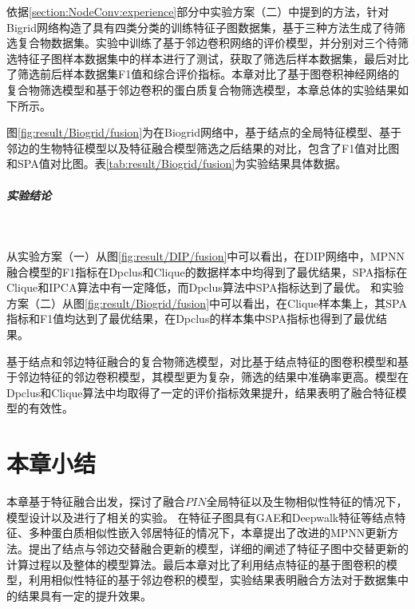 依据\ref{section:NodeConv:experience}部分中实验方案（二）中提到的方法，针对Bigrid网络构造了具有四类分类的训练特征子图数据集，基于三种方法生成了待筛选复合物数据集。实验中训练了基于邻边卷积网络的评价模型，并分别对三个待筛选特征子图样本数据集中的样本进行了测试，获取了筛选后样本数据集，最后对比了筛选前后样本数据集F1值和综合评价指标。本章对比了基于图卷积神经网络的复合物筛选模型和基于邻边卷积的蛋白质复合物筛选模型，本章总体的实验结果如下所示。

图\ref{fig:result/Biogrid/fusion}为在Biogrid网络中，基于结点的全局特征模型、基于邻边的生物特征模型以及特征融合模型筛选之后结果的对比，包含了F1值对比图和SPA值对比图。表\ref{tab:result/Biogrid/fusion}为实验结果具体数据。

\subparagraph*{实验结论} ~

从实验方案（一）从图\ref{fig:result/DIP/fusion}中可以看出，在DIP网络中，MPNN融合模型的F1指标在Dpclus和Clique的数据样本中均得到了最优结果，SPA指标在Clique和IPCA算法中有一定降低，而Dpclus算法中SPA指标达到了最优。
和实验方案（二）从图\ref{fig:result/Biogrid/fusion}中可以看出，在Clique样本集上，其SPA指标和F1值均达到了最优结果，在Dpclus的样本集中SPA指标也得到了最优结果。

基于结点和邻边特征融合的复合物筛选模型，对比基于结点特征的图卷积模型和基于邻边特征的邻边卷积模型，其模型更为复杂，筛选的结果中准确率更高。模型在Dpclus和Clique算法中均取得了一定的评价指标效果提升，结果表明了融合特征模型的有效性。


\section{本章小结}
\label{section:MPNN:summary}

本章基于特征融合出发，探讨了融合$PIN$全局特征以及生物相似性特征的情况下，模型设计以及进行了相关的实验。
在特征子图具有GAE和Deepwalk特征等结点特征、多种蛋白质相似性嵌入邻居特征的情况下，本章提出了改进的MPNN更新方法。提出了结点与邻边交替融合更新的模型，详细的阐述了特征子图中交替更新的计算过程以及整体的模型算法。最后本章对比了利用结点特征的基于图卷积的模型，利用相似性特征的基于邻边卷积的模型，实验结果表明融合方法对于数据集中的结果具有一定的提升效果。